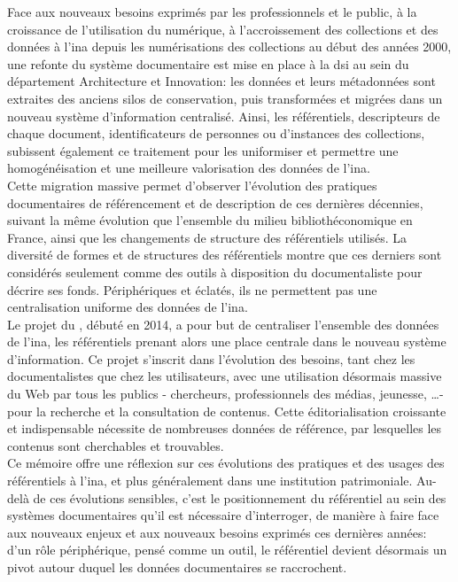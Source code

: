 Face aux nouveaux besoins exprimés par les professionnels et le public, à la croissance de l'utilisation du numérique, à l'accroissement des collections et des données à l'\ac{ina} depuis les numérisations des collections au début des années 2000, une refonte du système documentaire est mise en place à la \ac{dsi} au sein du département \og Architecture et Innovation\fg{}: les données et leurs métadonnées sont extraites des anciens silos de conservation, puis transformées et migrées dans un nouveau système d'information centralisé. Ainsi, les référentiels, descripteurs de chaque document, identificateurs de personnes ou d'instances des collections, subissent également ce traitement pour les uniformiser et permettre une homogénéisation et une meilleure valorisation des données de l'\ac{ina}.\\

Cette migration massive permet d'observer l'évolution des pratiques documentaires de référencement et de description de ces dernières décennies, suivant la même évolution que l'ensemble du milieu bibliothéconomique en France, ainsi que les changements de structure des référentiels utilisés. La diversité de formes et de structures des référentiels montre que ces derniers sont considérés seulement comme des outils à disposition du documentaliste pour décrire ses fonds. Périphériques et éclatés, ils ne permettent pas une centralisation uniforme des données de l'\ac{ina}.\\

Le projet du \ldd, débuté en 2014, a pour but de centraliser l'ensemble des données de l'\ac{ina}, les référentiels prenant alors une place centrale dans le nouveau système d'information. Ce projet s'inscrit dans l'évolution des besoins, tant chez les documentalistes que chez les utilisateurs, avec une utilisation désormais massive du Web par tous les publics - chercheurs, professionnels des médias, jeunesse, \dots - pour la recherche et la consultation de contenus. Cette éditorialisation croissante et indispensable nécessite de nombreuses données de référence, par lesquelles les contenus sont cherchables et trouvables.\\

Ce mémoire offre une réflexion sur ces évolutions des pratiques et des usages des référentiels à l'\ac{ina}, et plus généralement dans une institution patrimoniale. Au-delà de ces évolutions sensibles, c'est le positionnement du référentiel au sein des systèmes documentaires qu'il est nécessaire d'interroger, de manière à faire face aux nouveaux enjeux et aux nouveaux besoins exprimés ces dernières années: d'un rôle périphérique, pensé comme un outil, le référentiel devient désormais un pivot autour duquel les données documentaires se raccrochent.\\

